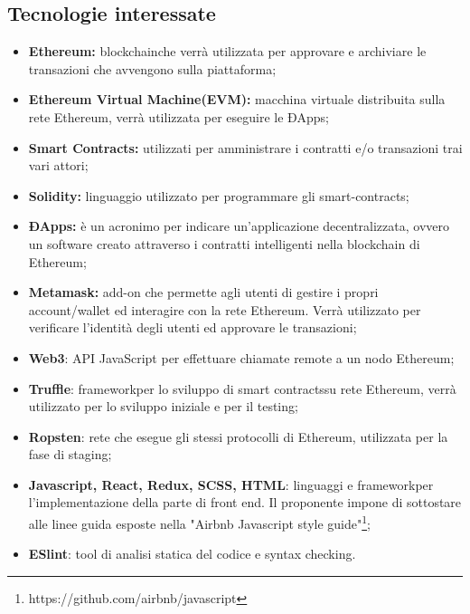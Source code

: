 \subsection{Tecnologie interessate}
\begin{itemize}
  
	\item \textbf{Ethereum\glo:} blockchain\glosp che verrà utilizzata per approvare e archiviare le transazioni che avvengono sulla piattaforma;
	\item \textbf{Ethereum Virtual Machine\glosp (EVM):} macchina virtuale distribuita sulla rete Ethereum\glo, verrà utilizzata per eseguire le ÐApps\glo; 
	\item \textbf{Smart Contracts\glo:} utilizzati per amministrare i contratti e/o transazioni trai vari attori;
	\item \textbf{Solidity:} linguaggio utilizzato per programmare gli smart-contracts\glo;
	\item \textbf{ÐApps\glo:} è un acronimo per indicare un'applicazione decentralizzata, ovvero un software creato attraverso i contratti intelligenti nella blockchain di Ethereum\glo;
	\item \textbf{Metamask\glo:} add-on che permette agli utenti di gestire i propri account/wallet ed interagire con la rete Ethereum\glo. Verrà utilizzato per verificare l'identità degli utenti ed approvare le transazioni; 
	\item \textbf{Web3}: API JavaScript per effettuare chiamate remote a un nodo Ethereum\glo;
	\item \textbf{Truffle}: framework\glosp per lo sviluppo di smart contracts\glosp su rete Ethereum\glo, verrà utilizzato per lo sviluppo iniziale e per il testing;
	\item \textbf {Ropsten}: rete che esegue gli stessi protocolli di Ethereum\glo, utilizzata per la fase di staging;
	\item \textbf{Javascript, React\glo, Redux\glo, SCSS\glo, HTML}: linguaggi e framework\glosp per l'implementazione della parte di front end. Il proponente impone di sottostare alle linee guida esposte nella "Airbnb Javascript style guide"\footnote{https://github.com/airbnb/javascript};
	\item \textbf{ESlint\glo}: tool di analisi statica del codice e syntax checking.

\end{itemize}

